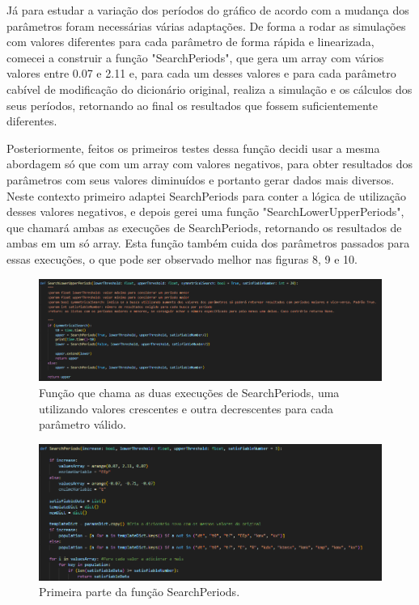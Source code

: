 \documentclass[brazilian,12pt,a4paper,final]{article}
\begin{document}
	Já para estudar a variação dos períodos do gráfico de acordo com a mudança dos parâmetros foram necessárias várias adaptações. De forma a rodar as simulações com valores diferentes para cada parâmetro de forma rápida e linearizada, comecei a construir a função "SearchPeriods", que gera um array com vários valores entre 0.07 e 2.11 e, para cada um desses valores e para cada parâmetro cabível de modificação do dicionário original, realiza a simulação e os cálculos dos seus períodos, retornando ao final os resultados que fossem suficientemente diferentes.
	\vspace{0.5cm}

	Posteriormente, feitos os primeiros testes dessa função decidi usar a mesma abordagem só que com um array com valores negativos, para obter resultados dos parâmetros com seus valores diminuídos e portanto gerar dados mais diversos. Neste contexto primeiro adaptei SearchPeriods para conter a lógica de utilização desses valores negativos, e depois gerei uma função "SearchLowerUpperPeriods", que chamará ambas as execuções de SearchPeriods, retornando os resultados de ambas em um só array. Esta função também cuida dos parâmetros passados para essas execuções, o que pode ser observado melhor nas figuras 8, 9 e 10.
	
	\begin{figure}[hbtp]
		\begin{center}
			\includegraphics[width=16cm]{SearchLowerUpperPeriods.png}
			\caption{Função que chama as duas execuções de SearchPeriods, uma utilizando valores crescentes e outra decrescentes para cada parâmetro válido.}
			\label{fig}
		\end{center}
	\end{figure}
	
	\begin{figure}[hbtp]
		\begin{center}
			\includegraphics[width=16cm]{SearchPeriods1.png}
			\caption{Primeira parte da função SearchPeriods.}
			\label{fig}
		\end{center}
	\end{figure}
	
\end{document}
